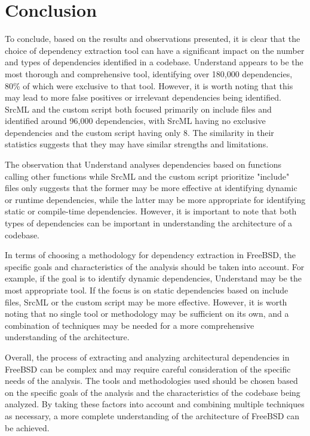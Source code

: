 \documentclass[12pt, dvipsnames, a4paper]{article}
\begin{document}
\section{Conclusion}
To conclude, based on the results and observations presented, it is clear that the choice of dependency extraction tool can have a significant impact on the number and types of dependencies identified in a codebase. Understand appears to be the most thorough and comprehensive tool, identifying over 180,000 dependencies, 80\% of which were exclusive to that tool. However, it is worth noting that this may lead to more false positives or irrelevant dependencies being identified. SrcML and the custom script both focused primarily on include files and identified around 96,000 dependencies, with SrcML having no exclusive dependencies and the custom script having only 8. The similarity in their statistics suggests that they may have similar strengths and limitations.

The observation that Understand analyses dependencies based on functions calling other functions while SrcML and the custom script prioritize "include" files only suggests that the former may be more effective at identifying dynamic or runtime dependencies, while the latter may be more appropriate for identifying static or compile-time dependencies. However, it is important to note that both types of dependencies can be important in understanding the architecture of a codebase.

In terms of choosing a methodology for dependency extraction in FreeBSD, the specific goals and characteristics of the analysis should be taken into account. For example, if the goal is to identify dynamic dependencies, Understand may be the most appropriate tool. If the focus is on static dependencies based on include files, SrcML or the custom script may be more effective. However, it is worth noting that no single tool or methodology may be sufficient on its own, and a combination of techniques may be needed for a more comprehensive understanding of the architecture.

Overall, the process of extracting and analyzing architectural dependencies in FreeBSD can be complex and may require careful consideration of the specific needs of the analysis. The tools and methodologies used should be chosen based on the specific goals of the analysis and the characteristics of the codebase being analyzed. By taking these factors into account and combining multiple techniques as necessary, a more complete understanding of the architecture of FreeBSD can be achieved.
\end{document}
